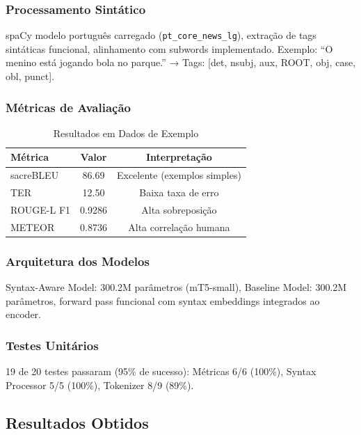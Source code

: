 \documentclass[12pt]{article}
\begin{document}
\subsubsection{Processamento Sintático}

spaCy modelo português carregado (\texttt{pt\_core\_news\_lg}), extração de tags sintáticas funcional, alinhamento com subwords implementado. Exemplo: ``O menino está jogando bola no parque.'' → Tags: [det, nsubj, aux, ROOT, obj, case, obl, punct].

\subsubsection{Métricas de Avaliação}

\begin{table}[ht]
\centering
\caption{Resultados em Dados de Exemplo}
\label{tab:metricas}
\begin{tabular}{lcc}
\toprule
Métrica & Valor & Interpretação \\
\midrule
sacreBLEU & 86.69 & Excelente (exemplos simples) \\
TER & 12.50 & Baixa taxa de erro \\
ROUGE-L F1 & 0.9286 & Alta sobreposição \\
METEOR & 0.8736 & Alta correlação humana \\
\bottomrule
\end{tabular}
\end{table}

\subsubsection{Arquitetura dos Modelos}

Syntax-Aware Model: 300.2M parâmetros (mT5-small), Baseline Model: 300.2M parâmetros, forward pass funcional com syntax embeddings integrados ao encoder.

\subsubsection{Testes Unitários}

19 de 20 testes passaram (95\% de sucesso): Métricas 6/6 (100\%), Syntax Processor 5/5 (100\%), Tokenizer 8/9 (89\%).

\subsection{Resultados Obtidos}
\end{document}
